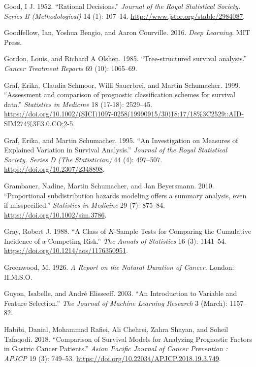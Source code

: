 \documentclass[
  letterpaper,
  krantz2]{style/krantz}
\newlength{\cslhangindent}
\newenvironment{CSLReferences}[2] %
 {\begin{list}{}{%
  \setlength{\itemindent}{0pt}
  \setlength{\leftmargin}{0pt}
  \setlength{\parsep}{0pt}
  \ifodd #1
   \setlength{\leftmargin}{\cslhangindent}
   \setlength{\itemindent}{-1\cslhangindent}
  \fi
  \setlength{\itemsep}{#2\baselineskip}}}
 {\end{list}}
\begin{document}
\begin{CSLReferences}{1}{0}
Good, I J. 1952. {``{Rational Decisions}.''} \emph{Journal of the Royal
Statistical Society. Series B (Methodological)} 14 (1): 107--14.
\url{http://www.jstor.org/stable/2984087}.

Goodfellow, Ian, Yoshua Bengio, and Aaron Courville. 2016. \emph{Deep
Learning}. MIT Press.

Gordon, Louis, and Richard A Olshen. 1985. {``{Tree-structured survival
analysis.}''} \emph{Cancer Treatment Reports} 69 (10): 1065--69.

Graf, Erika, Claudia Schmoor, Willi Sauerbrei, and Martin Schumacher.
1999. {``{Assessment and comparison of prognostic classification schemes
for survival data}.''} \emph{Statistics in Medicine} 18 (17-18):
2529--45.
\url{https://doi.org/10.1002/(SICI)1097-0258(19990915/30)18:17/18\%3C2529::AID-SIM274\%3E3.0.CO;2-5}.

Graf, Erika, and Martin Schumacher. 1995. {``{An Investigation on
Measures of Explained Variation in Survival Analysis}.''} \emph{Journal
of the Royal Statistical Society. Series D (The Statistician)} 44 (4):
497--507. \url{https://doi.org/10.2307/2348898}.

Grambauer, Nadine, Martin Schumacher, and Jan Beyersmann. 2010.
{``{Proportional subdistribution hazards modeling offers a summary
analysis, even if misspecified}.''} \emph{Statistics in Medicine} 29
(7): 875--84. \url{https://doi.org/10.1002/sim.3786}.

Gray, Robert J. 1988. {``{A Class of \(K\)-Sample Tests for Comparing
the Cumulative Incidence of a Competing Risk}.''} \emph{The Annals of
Statistics} 16 (3): 1141--54.
\url{https://doi.org/10.1214/aos/1176350951}.

Greenwood, M. 1926. \emph{A Report on the Natural Duration of Cancer.}
London: H.M.S.O.

Guyon, Isabelle, and André Elisseeff. 2003. {``An Introduction to
Variable and Feature Selection.''} \emph{The Journal of Machine Learning
Research} 3 (March): 1157--82.

Habibi, Danial, Mohammad Rafiei, Ali Chehrei, Zahra Shayan, and Soheil
Tafaqodi. 2018. {``{Comparison of Survival Models for Analyzing
Prognostic Factors in Gastric Cancer Patients}.''} \emph{Asian Pacific
Journal of Cancer Prevention : APJCP} 19 (3): 749--53.
\url{https://doi.org/10.22034/APJCP.2018.19.3.749}.


\end{CSLReferences}
\end{document}
